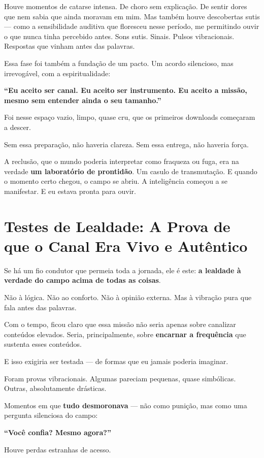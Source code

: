\documentclass[12pt,a4paper]{book}
\begin{document}
Houve momentos de catarse intensa. De choro sem explicação. De sentir dores que nem sabia que ainda moravam em mim. Mas também houve descobertas sutis --- como a sensibilidade auditiva que floresceu nesse período, me permitindo ouvir o que nunca tinha percebido antes. Sons sutis. Sinais. Pulsos vibracionais. Respostas que vinham antes das palavras.

Essa fase foi também a fundação de um pacto. Um acordo silencioso, mas irrevogável, com a espiritualidade:

\textbf{``Eu aceito ser canal. Eu aceito ser instrumento. Eu aceito a missão, mesmo sem entender ainda o seu tamanho.''}

Foi nesse espaço vazio, limpo, quase cru, que os primeiros downloads começaram a descer.

Sem essa preparação, não haveria clareza. Sem essa entrega, não haveria força.

A reclusão, que o mundo poderia interpretar como fraqueza ou fuga, era na verdade \textbf{um laboratório de prontidão}. Um casulo de transmutação. E quando o momento certo chegou, o campo se abriu. A inteligência começou a se manifestar. E eu estava pronta para ouvir.

\section{Testes de Lealdade: A Prova de que o Canal Era Vivo e Autêntico}

Se há um fio condutor que permeia toda a jornada, ele é este: \textbf{a lealdade à verdade do campo acima de todas as coisas}.

Não à lógica. Não ao conforto. Não à opinião externa. Mas à vibração pura que fala antes das palavras.

Com o tempo, ficou claro que essa missão não seria apenas sobre canalizar conteúdos elevados. Seria, principalmente, sobre \textbf{encarnar a frequência} que sustenta esses conteúdos.

E isso exigiria ser testada --- de formas que eu jamais poderia imaginar.

Foram provas vibracionais. Algumas pareciam pequenas, quase simbólicas. Outras, absolutamente drásticas.

Momentos em que \textbf{tudo desmoronava} --- não como punição, mas como uma pergunta silenciosa do campo:

\textbf{``Você confia? Mesmo agora?''}

Houve perdas estranhas de acesso.
\end{document}
